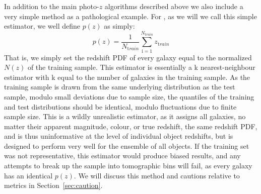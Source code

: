 In addition to the main photo-$z$ algorithms described above we also include a very simple method as a pathological example.
For \trainz, as we will we call this simple estimator, we well define $p(z)$ as simply:
\begin{equation}
p(z) = \frac{1}{N_{ \mathrm train}}\sum_{\mathrm i=1}^{N_{\mathrm train}}z_{\mathrm train}
\end{equation}
That is, we simply set the redshift PDF of every galaxy equal to the normalized $N(z)$ of the training sample.
This estimator is essentially a k nearest-neighbour estimator with k equal to the number of galaxies in the training sample.
As the training sample is drawn from the same underlying distribution as the test sample, modulo small deviations due to sample size, the quantiles of the training and test distributions should be identical, modulo fluctuations due to finite sample size.
This is a wildly unrealistic estimator, as it assigns all galaxies, no matter their apparent magnitude, colour, or true redshift, the same redshift PDF, and is thus uninformative at the level of individual object redshifts, but is designed to perform very well for the ensemble of all objects.
If the training set was not representative, this estimator would produce biased results, and any attempts to break up the sample into tomographic bins will fail, as every galaxy has an identical $p(z)$.
We will discuss this method and cautions relative to metrics in Section~\ref{sec:caution}.
